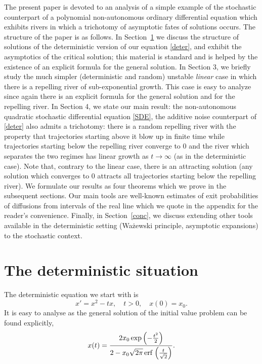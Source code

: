 \documentclass[sn-mathphys-num]{sn-jnl}
\theoremstyle{definition}
\numberwithin{equation}{section} \theoremstyle{remark}
\newcommand{\1}{\mathbbm{1}}
\begin{document}
The present paper is devoted to an analysis of a simple example of the
stochastic counterpart of a polynomial non-autonomous ordinary
differential equation which exhibits rivers in which a trichotomy of
asymptotic fates of solutions occurs. The structure of the paper is as
follows. In Section~\ref{det} we discuss the structure of solutions of
the deterministic version of our equation \eqref{deter}, and exhibit
the asymptotics of the critical solution; this material is standard
and is helped by the existence of an explicit formula for the general
solution. In Section 3, we briefly study the much simpler
(deterministic and random) unstable {\em linear} case in which there
is a repelling river of sub-exponential growth.  This case is easy to
analyze since again there is an explicit formula for the general
solution and for the repelling river. In Section 4, we state our main
result: the non-autonomous quadratic stochastic differential equation
\eqref{SDE}, the additive noise counterpart of \eqref{deter} also
admits a trichotomy: there is a random repelling river with the
property that trajectories starting above it blow up in finite time
while trajectories starting below the repelling river converge to 0
and the river which separates the two regimes has linear growth as
$t \rightarrow \infty$ (as in the deterministic case). Note that,
contrary to the linear case, there is an attracting solution (any
solution which converges to 0 attracts all trajectories starting below
the repelling river).  We formulate our results as four theorems which
we prove in the subsequent sections. Our main tools are well-known
estimates of exit probabilities of diffusions from intervals of the
real line which we quote in the appendix for the reader's convenience.
Finally, in Section~\ref{conc}, we discuss extending other tools
available in the deterministic setting (Wa\.zewski principle,
asymptotic expansions) to the stochastic context.

\section{The deterministic situation} \label{det}

The deterministic equation we start with is
\begin{equation}\label{deter}
  x'= x^2-tx, \quad t>0, \quad x(0)=x_0.
\end{equation}
It is easy to analyse as the general solution of the initial value
problem can be found explicitly,
\begin{equation}\label{expl}
  x(t) = \frac{2x_0\exp\left( - \frac{t^2}{2} \right)}
  {2- x_0\sqrt{2\pi}\, \hbox{erf}\,\left( \frac{t}{\sqrt{2}} \right)}.
\end{equation}
\end{document}

